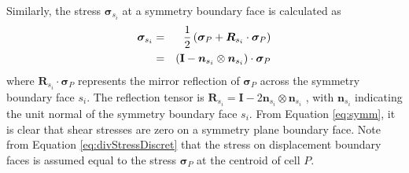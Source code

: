 \documentclass[sn-mathphys,Numbered]{sn-jnl}%
\newcommand{\bb}{\boldsymbol}
\begin{document}
Similarly, the stress $\bb{\sigma}_{s_i}$ at a symmetry boundary face is calculated as
\begin{eqnarray} \label{eq:symm}
	\bb{\sigma}_{s_i}
		&=& \frac{1}{2} \left (\bb{\sigma}_P + \bb{R}_{s_i} \cdot \bb{\sigma}_{P} \right) \notag \\
		&=& \left (\textbf{I} - \bb{n}_{s_i} \otimes \bb{n}_{s_i} \right) \cdot \bb{\sigma}_P
\end{eqnarray}
where $\bb{R}_{s_i} \cdot \bb{\sigma}_{P}$ represents the mirror reflection of $\bb{\sigma}_P$ across the symmetry boundary face $s_i$.
The reflection tensor is $\bb{R}_{s_i} = \textbf{I} - 2 \bb{n}_{s_i} \otimes \bb{n}_{s_i}$ \citep{Demirdzic2022}, with $\bb{n}_{s_i}$ indicating the unit normal of the symmetry boundary face $s_i$.
From Equation \ref{eq:symm}, it is clear that shear stresses are zero on a symmetry plane boundary face.
Note from Equation \ref{eq:divStressDiscret} that the stress on displacement boundary faces is assumed equal to the stress $\bb{\sigma}_P$ at the centroid of cell $P$.
\end{document}
